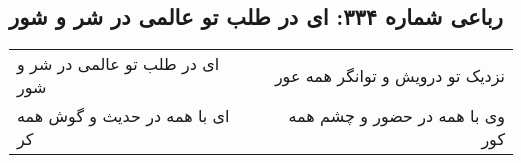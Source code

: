 \begin{center}
\section*{رباعی شماره ۳۳۴: ای در طلب تو عالمی در شر و شور}
\label{sec:sh334}
\begin{longtable}{l p{0.5cm} r}
ای در طلب تو عالمی در شر و شور
&&
نزدیک تو درویش و توانگر همه عور
\\
ای با همه در حدیث و گوش همه کر
&&
وی با همه در حضور و چشم همه کور
\\
\end{longtable}
\end{center}

